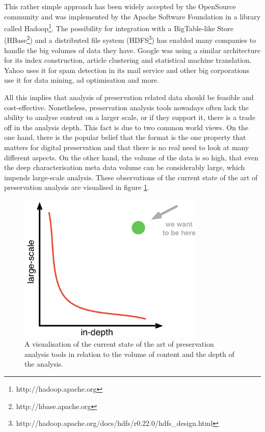 This rather simple approach has been widely accepted by the OpenSource community and was implemented by the Apache Software Foundation in a library called Hadoop\footnote{http://hadoop.apache.org}. The possibility for integration with a BigTable-like Store \cite{Chang:2008:BDS:1365815.1365816} (HBase\footnote{http://hbase.apache.org}) and a distributed file system (HDFS\footnote{http://hadoop.apache.org/docs/hdfs/r0.22.0/hdfs\_design.html}) has enabled many companies to handle the big volumes of data they have. Google was using a similar architecture for its index construction, article clustering and statistical machine translation. Yahoo uses it for spam detection in its mail service and other big corporations use it for data mining, ad optimisation and more.

All this implies that analysis of preservation related data should be feasible and cost-effective. Nonetheless, preservation analysis tools nowadays often lack the ability to analyse content on a larger scale, or if they support it, there is a trade off in the analysis depth. This fact is due to two common world views. On the one hand, there is the popular belief that the format is the one property that matters for digital preservation \cite{citeulike:8904907} and that there is no real need to look at many different aspects. On the other hand, the volume of the data is so high, that even the deep characterisation meta data volume can be considerably large, which impends large-scale analysis. These observations of the current state of the art of preservation analysis are visualised in figure \ref{fig:sota_analysis}.

\begin{figure}[th]
\begin{center}
\includegraphics[width=3.5in]{figures/related/sota_analysis.png}
\caption{A visualisation of the current state of the art of preservation analysis tools in relation to the volume of content and the depth of the analysis.}
\label{fig:sota_analysis}
\end{center}
\end{figure}

